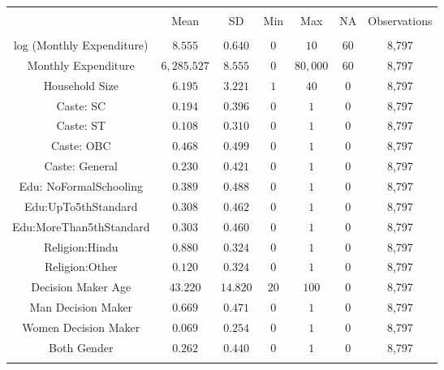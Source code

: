 
\begin{tabular}{@{\extracolsep{5pt}} ccccccc} 
\\[-1.8ex]\hline 
\hline \\[-1.8ex] 
 & Mean & SD & Min & Max & NA & Observations \\ 
\hline \\[-1.8ex] 
log (Monthly Expenditure) & $8.555$ & $0.640$ & $0$ & $10$ & $60$ & 8,797 \\ 
Monthly Expenditure & $6,285.527$ & $8.555$ & $0$ & $80,000$ & $60$ & 8,797 \\ 
Household Size & $6.195$ & $3.221$ & $1$ & $40$ & $0$ & 8,797 \\ 
Caste: SC & $0.194$ & $0.396$ & $0$ & $1$ & $0$ & 8,797 \\ 
Caste: ST & $0.108$ & $0.310$ & $0$ & $1$ & $0$ & 8,797 \\ 
Caste: OBC & $0.468$ & $0.499$ & $0$ & $1$ & $0$ & 8,797 \\ 
Caste: General & $0.230$ & $0.421$ & $0$ & $1$ & $0$ & 8,797 \\ 
Edu: NoFormalSchooling & $0.389$ & $0.488$ & $0$ & $1$ & $0$ & 8,797 \\ 
Edu:UpTo5thStandard & $0.308$ & $0.462$ & $0$ & $1$ & $0$ & 8,797 \\ 
Edu:MoreThan5thStandard & $0.303$ & $0.460$ & $0$ & $1$ & $0$ & 8,797 \\ 
Religion:Hindu & $0.880$ & $0.324$ & $0$ & $1$ & $0$ & 8,797 \\ 
Religion:Other & $0.120$ & $0.324$ & $0$ & $1$ & $0$ & 8,797 \\ 
Decision Maker Age & $43.220$ & $14.820$ & $20$ & $100$ & $0$ & 8,797 \\ 
Man Decision Maker & $0.669$ & $0.471$ & $0$ & $1$ & $0$ & 8,797 \\ 
Women Decision Maker & $0.069$ & $0.254$ & $0$ & $1$ & $0$ & 8,797 \\ 
Both Gender & $0.262$ & $0.440$ & $0$ & $1$ & $0$ & 8,797 \\ 
\hline \\[-1.8ex] 
\end{tabular} 
